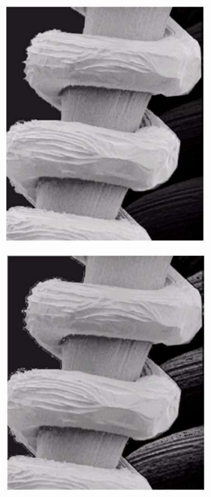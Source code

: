 \documentclass[a4paper,11pt]{article}
\begin{document}
\newpage
\renewcommand{\thefigure}{5.24}
\begin{figure}[!h]
\centering
\begin{subfigure}{.5\textwidth}
  \centering
  \includegraphics[scale=0.4]{images/5/stat_enhancement_orig.png}
\end{subfigure}%
\begin{subfigure}{.5\textwidth}
  \centering
  \includegraphics[scale=0.4]{images/5/stat_enhancement_proc.png}

\end{subfigure}
\end{figure}
\end{document}

